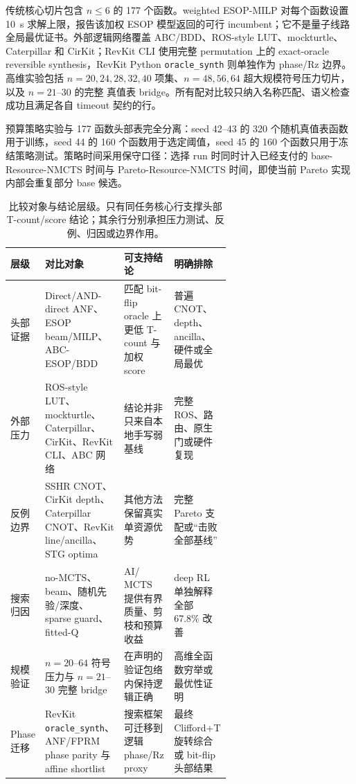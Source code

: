\documentclass[UTF8,fontset=fandol,11pt]{ctexart}
\newcommand{\method}{Resource-NMCTS}
\newcommand{\mcts}{\ensuremath{\mathrm{MCTS}}}
\newcommand{\ttable}{真值表}
\begin{document}
传统核心切片包含 $n\leq6$ 的 177 个函数。weighted ESOP-MILP 对每个函数设置 10~s 求解上限，报告该加权 ESOP 模型返回的可行 incumbent；它不是量子线路全局最优证书。外部逻辑网络覆盖 ABC/BDD、ROS-style LUT、mockturtle、Caterpillar 和 CirKit；RevKit CLI 使用完整 permutation 上的 exact-oracle reversible synthesis，RevKit Python \texttt{oracle\_synth} 则单独作为 phase/Rz 边界。高维实验包括 $n=20,24,28,32,40$ 项集、$n=48,56,64$ 超大规模符号压力切片，以及 $n=21$--$30$ 的完整 \ttable{} bridge。所有配对比较只纳入名称匹配、语义检查成功且满足各自 timeout 契约的行。

预算策略实验与 177 函数头部表完全分离：seed 42--43 的 320 个随机真值表函数用于训练，seed 44 的 160 个函数用于选定阈值，seed 45 的 160 个函数只用于冻结策略测试。策略时间采用保守口径：选择 run 时同时计入已经支付的 base-\method{} 时间与 Pareto-\method{} 时间，即使当前 Pareto 实现内部会重复部分 base 候选。

\begin{table}[H]
\centering
\tiny
\setlength{\tabcolsep}{2.2pt}
\renewcommand{\arraystretch}{1.05}
\caption{比较对象与结论层级。只有同任务核心行支撑头部 T-count/score 结论；其余行分别承担压力测试、反例、归因或边界作用。}
\label{tab:claim-hierarchy-zh}
\begin{tabularx}{\linewidth}{>{\raggedright\arraybackslash}p{0.13\linewidth}>{\raggedright\arraybackslash}p{0.26\linewidth}>{\raggedright\arraybackslash}X>{\raggedright\arraybackslash}p{0.24\linewidth}}
\toprule
层级 & 对比对象 & 可支持结论 & 明确排除 \\
\midrule
头部证据 & Direct/AND-direct ANF、ESOP beam/MILP、ABC-ESOP/BDD & 匹配 bit-flip oracle 上更低 T-count 与加权 score & 普遍 CNOT、depth、ancilla、硬件或全局最优 \\
外部压力 & ROS-style LUT、mockturtle、Caterpillar、CirKit、RevKit CLI、ABC 网络 & 结论并非只来自本地手写弱基线 & 完整 ROS、路由、原生门或硬件复现 \\
反例边界 & SSHR CNOT、CirKit depth、Caterpillar CNOT、RevKit line/ancilla、STG optima & 其他方法保留真实单资源优势 & 完整 Pareto 支配或“击败全部基线” \\
搜索归因 & no-\mcts{}、beam、随机先验/深度、sparse guard、fitted-Q & AI/\mcts{} 提供有界质量、剪枝和预算收益 & deep RL 单独解释全部 67.8\% 改善 \\
规模验证 & $n=20$--$64$ 符号压力与 $n=21$--$30$ 完整 bridge & 在声明的验证包络内保持逻辑正确 & 高维全函数穷举或最优性证明 \\
Phase 迁移 & RevKit \texttt{oracle\_synth}、ANF/FPRM phase parity 与 affine shortlist & 搜索框架可迁移到逻辑 phase/Rz proxy & 最终 Clifford+T 旋转综合或 bit-flip 头部结果 \\
\bottomrule
\end{tabularx}
\end{table}
\end{document}
